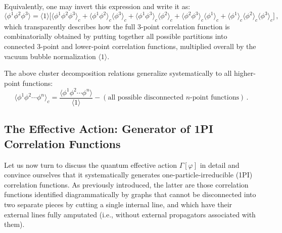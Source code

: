 
Equivalently, one may invert this expression and write it as:
\begin{equation} \label{eq:three_point_decomposition}
    \langle \phi^1 \phi^2 \phi^3 \rangle = \langle 1 \rangle \Big[ \langle \phi^1 \phi^2 \phi^3 \rangle_c + \langle \phi^1 \phi^2 \rangle_c \langle \phi^3 \rangle_c + \langle \phi^1 \phi^3 \rangle_c \langle \phi^2 \rangle_c + \langle \phi^2 \phi^3 \rangle_c \langle \phi^1 \rangle_c + \langle \phi^1 \rangle_c \langle \phi^2 \rangle_c \langle \phi^3 \rangle_c \Big] \, ,
\end{equation}
which transparently describes how the full 3-point correlation function is combinatorially obtained by putting together all possible partitions into connected 3-point and lower-point correlation functions, multiplied overall by the vacuum bubble normalization \(\langle 1 \rangle\).

The above cluster decomposition relations generalize systematically to all higher-point functions:
\begin{equation} \label{eq:general_connected_correlator}
    \langle \phi^1 \phi^2 \cdots \phi^n \rangle_c = \frac{\langle \phi^1 \phi^2 \cdots \phi^n \rangle}{\langle 1 \rangle} - (\text{all possible disconnected } n\text{-point functions}) \, .
\end{equation}

\subsection{The Effective Action: Generator of 1PI Correlation Functions}

Let us now turn to discuss the quantum effective action \(\Gamma[\varphi]\) in detail and convince ourselves that it systematically generates one-particle-irreducible (1PI) correlation functions. As previously introduced, the latter are those correlation functions identified diagrammatically by graphs that cannot be disconnected into two separate pieces by cutting a single internal line, and which have their external lines fully amputated (i.e., without external propagators associated with them).

